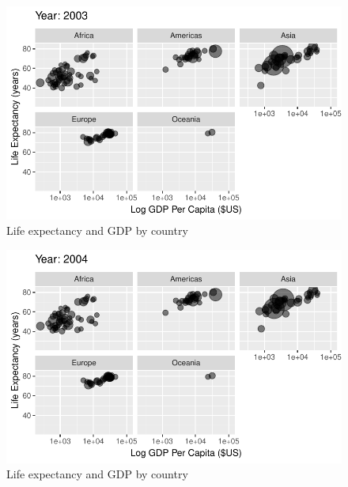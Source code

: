 \documentclass[
  letterpaper,
  DIV=11,
  numbers=noendperiod]{scrreport}
\theoremstyle{definition}
\theoremstyle{remark}
\begin{document}
\begin{figure}

{\centering \includegraphics{index_files/figure-pdf/fig-anim-lifegdp-93.pdf}

}

\caption{\label{fig-anim-lifegdp-93}Life expectancy and GDP by country}

\end{figure}

\begin{figure}

{\centering \includegraphics{index_files/figure-pdf/fig-anim-lifegdp-94.pdf}

}

\caption{\label{fig-anim-lifegdp-94}Life expectancy and GDP by country}

\end{figure}
\end{document}
